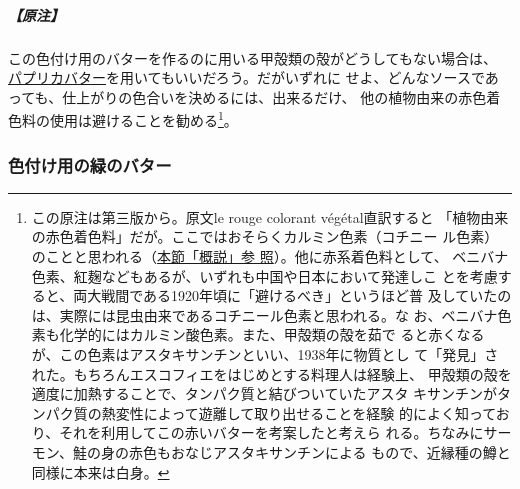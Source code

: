 \begin{recette}
\hypertarget{nota-beurre-colorant-rouge}{%
\subparagraph{【原注】}\label{nota-beurre-colorant-rouge}}

この色付け用のバターを作るのに用いる甲殻類の殻がどうしてもない場合は、
\protect\hyperlink{beurre-de-paprika}{パプリカバター}を用いてもいいだろう。だがいずれに
せよ、どんなソースであっても、仕上がりの色合いを決めるには、出来るだけ、
他の植物由来の赤色着色料の使用は避けることを勧める\footnote{この原注は第三版から。原文le
  rouge colorant végétal直訳すると
  「植物由来の赤色着色料」だが。ここではおそらくカルミン色素（コチニー
  ル色素）のことと思われる（\protect\hyperlink{observation-sur-les-beurres-composes}{本節「概説」参
  照}）。他に赤系着色料として、
  ベニバナ色素、紅麹などもあるが、いずれも中国や日本において発達しこ
  とを考慮すると、両大戦間である1920年頃に「避けるべき」というほど普
  及していたのは、実際には昆虫由来であるコチニール色素と思われる。な
  お、ベニバナ色素も化学的にはカルミン酸色素。また、甲殻類の殻を茹で
  ると赤くなるが、この色素はアスタキサンチンといい、1938年に物質とし
  て「発見」された。もちろんエスコフィエをはじめとする料理人は経験上、
  甲殻類の殻を適度に加熱することで、タンパク質と結びついていたアスタ
  キサンチンがタンパク質の熱変性によって遊離して取り出せることを経験
  的によく知っており、それを利用してこの赤いバターを考案したと考えら
  れる。ちなみにサーモン、鮭の身の赤色もおなじアスタキサンチンによる
  もので、近縁種の鱒と同様に本来は白身。}。

\maeaki

\hypertarget{beurre-colorant-vert}{%
\subsubsection{色付け用の緑のバター}\label{beurre-colorant-vert}}




\end{recette}
